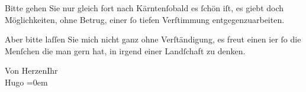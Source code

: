 \pstart
           Bitte gehen Sie nur gleich fort nach Kärntenſobald es ſchön iſt, es giebt doch Möglichkeiten,
               ohne Betrug, einer ſo tiefen Verſtimmung entgegenzuarbeiten.\pend
           
\pstart
           {\pb}Aber bitte laſſen Sie mich nicht
               ganz ohne Verſtändigung, es freut einen i{\geminationm}er ſo die
               Menſchen die man gern hat, in irgend einer Landſchaft zu denken.\pend
           
\pstart
           Von Herzen\hspace*{2em}Ihr{\\[\baselineskip]}\spacefill\mbox{Hugo}\pend
           \leftskip=0em{}\endnumbering{}  
      